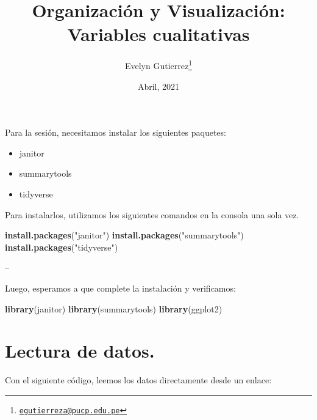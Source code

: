 \documentclass[
]{article}
\title{Organización y Visualización: Variables cualitativas}
\author{Evelyn Gutierrez\footnote{\href{mailto:egutierreza@pucp.edu.pe}{\nolinkurl{egutierreza@pucp.edu.pe}}}}
\date{Abril, 2021}
\newenvironment{Shaded}{\begin{snugshade}}{\end{snugshade}}
\newcommand{\KeywordTok}[1]{\textcolor[rgb]{0.13,0.29,0.53}{\textbf{#1}}}
\newcommand{\NormalTok}[1]{#1}
\newcommand{\StringTok}[1]{\textcolor[rgb]{0.31,0.60,0.02}{#1}}
\providecommand{\tightlist}{%
  \setlength{\itemsep}{0pt}\setlength{\parskip}{0pt}}
\begin{document}
\maketitle

{
\setcounter{tocdepth}{2}
\tableofcontents
}
\newline

\newpage

Para la sesión, necesitamos instalar los siguientes paquetes:

\begin{itemize}
\tightlist
\item
  janitor
\item
  summarytools
\item
  tidyverse
\end{itemize}

Para instalarlos, utilizamos los siguientes comandos en la consola una
sola vez.

\begin{Shaded}
\begin{Highlighting}[]
\KeywordTok{install.packages}\NormalTok{(}\StringTok{"janitor"}\NormalTok{)}
\KeywordTok{install.packages}\NormalTok{(}\StringTok{"summarytools"}\NormalTok{)}
\KeywordTok{install.packages}\NormalTok{(}\StringTok{"tidyverse"}\NormalTok{)}
\end{Highlighting}
\end{Shaded}

--

Luego, esperamos a que complete la instalación y verificamos:

\begin{Shaded}
\begin{Highlighting}[]
\KeywordTok{library}\NormalTok{(janitor)}
\KeywordTok{library}\NormalTok{(summarytools)}
\KeywordTok{library}\NormalTok{(ggplot2)}
\end{Highlighting}
\end{Shaded}

\hypertarget{lectura-de-datos.}{%
\section{Lectura de datos.}\label{lectura-de-datos.}}

Con el siguiente código, leemos los datos directamente desde un enlace:
\end{document}

